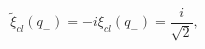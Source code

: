 \begin{equation}
\label{wximinus}
{\widetilde \xi}_{cl}(q_-)=-i \xi_{cl}(q_-)=\frac{i}{\sqrt{2}},
\end{equation}

